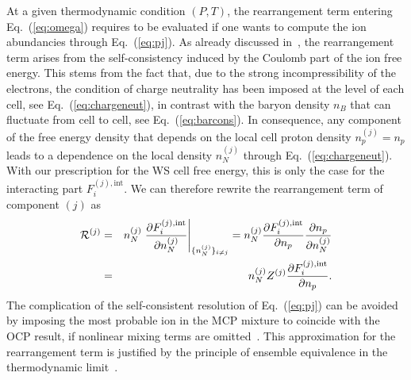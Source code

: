 At a given thermodynamic condition $(P,T)$, the rearrangement term entering 
Eq.~(\ref{eq:omega}) requires to be evaluated if one wants to compute the ion 
abundancies through Eq.~(\ref{eq:pj}).
As already discussed in~\cite{Grams2018,Fantina2020}, the rearrangement term 
arises from the self-consistency induced by the Coulomb part of the ion 
free energy. 
This stems from the fact that, due to the strong incompressibility of 
the electrons, the condition of charge neutrality has been imposed at the level 
of each cell, see Eq.~(\ref{eq:chargeneut}), in contrast with the baryon 
density $n_B$ that can fluctuate from cell to cell, see Eq.~(\ref{eq:barcons}). 
In consequence, any component of the free energy density that depends on the 
local cell proton density $n_p^{(j)} = n_p$ leads to a dependence on the local 
density $n_N^{(j)}$ through Eq.~(\ref{eq:chargeneut}). With our prescription 
for the WS cell free energy, this is only the case for the interacting part 
$F_i^{(j),\text{int}}$. We can therefore rewrite the rearrangement term of 
component $(j)$ as
%
\begin{eqnarray}
  \mathcal{R}^{(j)} 
  &=& n_N^{(j)} \left.\frac{\partial F_i^{(j),\text{int}}}{\partial
    n_N^{(j)}}\right|_{\{n_N^{(j)}\}_{i\neq j}}
    = n_N^{(j)} \frac{\partial F_i^{(j),\text{int}}}{\partial n_p}
    \frac{\partial n_p}{\partial n_N^{(j)}}\notag\\
  &=& n_N^{(j)} Z^{(j)} \frac{\partial F_i^{(j),\text{int}}}{\partial n_p}.
\end{eqnarray}
%
The complication of the self-consistent resolution of Eq.~(\ref{eq:pj}) can be 
avoided by imposing the most probable ion in the MCP mixture to coincide with 
the OCP result, if nonlinear mixing terms are omitted~\cite{Grams2018}. 
This approximation for the rearrangement term is justified by the principle of 
ensemble equivalence in the thermodynamic limit~\cite{Gulminelli2015}.

